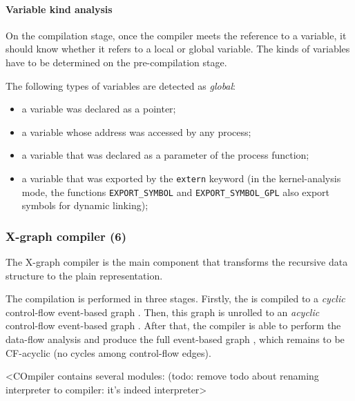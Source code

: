 \paragraph{Variable kind analysis}
\label{ch:impl:proc:x-pre-compiler:var}

On the compilation stage, once the compiler meets the reference to a variable, it should know whether it refers to a local or global variable.
The kinds of variables have to be determined on the pre-compilation stage.

\vspace{1em}
The following types of variables are detected as \textit{global}:
\begin{itemize}
\item a variable was declared as a pointer;
\item a variable whose address was accessed by any process;
\item a variable that was declared as a parameter of the process function;
\item a variable that was exported by the \texttt{extern} keyword (in the kernel-analysis mode, the functions \texttt{EXPORT\_SYMBOL} and \texttt{EXPORT\_SYMBOL\_GPL} also export symbols for dynamic linking); %
\end{itemize}


\subsubsection{X-graph compiler (6)}
\label{ch:impl:proc:x-compiler}

The X-graph compiler is the main component that transforms the recursive \ytree{} data structure to the plain \xgraph{} representation.

The compilation is performed in three stages.
Firstly, the \ytree{} is compiled to a \textit{cyclic} control-flow event-based graph \xgraph[CF].
Then, this graph is unrolled to an \textit{acyclic} control-flow event-based graph \xgraphU[CF].
After that, the compiler is able to perform the data-flow analysis and produce the full event-based graph \xgraphU[CF+DF], which remains to be CF-acyclic (no cycles among control-flow edges).

<COmpiler contains several modules: (todo: remove todo about renaming interpreter to compiler: it's indeed interpreter>

